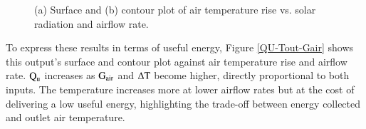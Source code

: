 \begin{figure}[ht!]
\begin{minipage}{0.49\columnwidth}
	\end{minipage}
	\caption{(a) Surface and (b) contour plot of air temperature rise vs. solar radiation and airflow rate.}
	\label{Tout-IT-Gair}
\end{figure}


\newpage
To express these results in terms of useful energy, Figure \ref{QU-Tout-Gair} shows this output's surface and contour plot against air temperature rise and airflow rate. $\rm{Q_u}$ increases as $\rm{G_{air}}$ and $\Delta \rm{T}$ become higher, directly proportional to both inputs. The temperature increases more at lower airflow rates but at the cost of delivering a low useful energy, highlighting the trade-off between energy collected and outlet air temperature.

